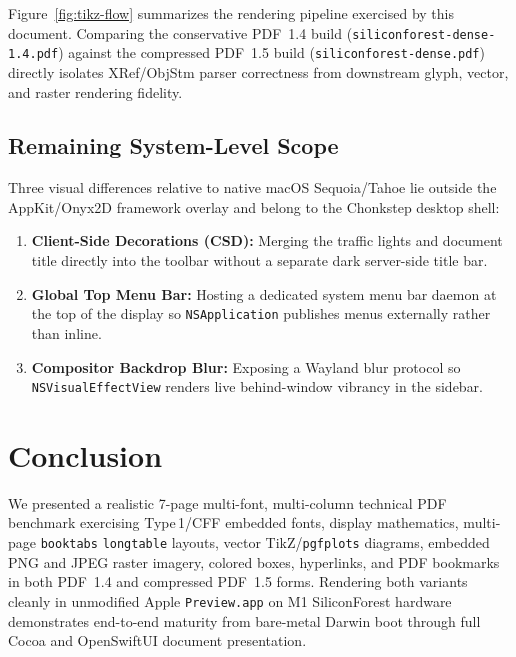 \documentclass[10pt,twocolumn,letterpaper]{article}
\begin{document}
Figure~\ref{fig:tikz-flow} summarizes the rendering pipeline exercised by this document. Comparing the conservative PDF~1.4 build (\texttt{siliconforest-dense-1.4.pdf}) against the compressed PDF~1.5 build (\texttt{siliconforest-dense.pdf}) directly isolates XRef/ObjStm parser correctness from downstream glyph, vector, and raster rendering fidelity.

\subsection{Remaining System-Level Scope}
Three visual differences relative to native macOS Sequoia/Tahoe lie outside the AppKit/Onyx2D framework overlay and belong to the Chonkstep desktop shell:
\begin{enumerate}[leftmargin=14pt,itemsep=2pt,topsep=3pt]
  \item \textbf{Client-Side Decorations (CSD):} Merging the traffic lights and document title directly into the toolbar without a separate dark server-side title bar.
  \item \textbf{Global Top Menu Bar:} Hosting a dedicated system menu bar daemon at the top of the display so \texttt{NSApplication} publishes menus externally rather than inline.
  \item \textbf{Compositor Backdrop Blur:} Exposing a Wayland blur protocol so \texttt{NSVisualEffectView} renders live behind-window vibrancy in the sidebar.
\end{enumerate}

\section{Conclusion}
\label{sec:conclusion}

We presented a realistic 7-page multi-font, multi-column technical PDF benchmark exercising Type\,1/CFF embedded fonts, display mathematics, multi-page \texttt{booktabs} \texttt{longtable} layouts, vector TikZ/\texttt{pgfplots} diagrams, embedded PNG and JPEG raster imagery, colored boxes, hyperlinks, and PDF bookmarks in both PDF~1.4 and compressed PDF~1.5 forms. Rendering both variants cleanly in unmodified Apple \texttt{Preview.app} on M1 SiliconForest hardware demonstrates end-to-end maturity from bare-metal Darwin boot through full Cocoa and OpenSwiftUI document presentation.
\end{document}
